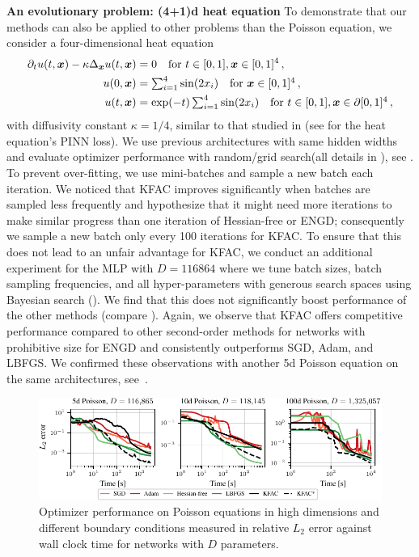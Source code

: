 \textbf{An evolutionary problem: (4+1)d heat equation}
To demonstrate that our methods can also be applied to other problems than the Poisson equation, we consider a four-dimensional heat equation
\begin{align}\label{eq:4D-heat}
  \begin{split}
    \partial_t u(t,{\bm{x}})-\kappa\Delta_{\bm{x}} u(t,{\bm{x}})
    &=
      0 \quad \text{for } t\in[0,1], {\bm{x}}\in [0,1]^{4}\,,
    \\
    u(0,{\bm{x}})
    &=
      \textstyle
      \sum_{i=1}^{4} \sin(2 x_i) \quad \text{for }
      {\bm{x}}\in [0,1]^{4}\,,
    \\
    u(t,{\bm{x}})
    &=
      \textstyle
      \exp(-t) \sum_{i=1}^{4} \sin(2 x_i) \quad \text{for } t\in[0,1], {\bm{x}}\in\partial[0,1]^{4}\,,
  \end{split}
\end{align}
with diffusivity constant $\kappa = 1/4$, similar to that studied in \cite{muller2023achieving} (see  for the heat equation's PINN loss).
We use previous architectures with same hidden widths and evaluate optimizer performance with random/grid search(all details in ), see .
To prevent over-fitting, we use mini-batches and sample a new batch each iteration.
We noticed that KFAC improves significantly when batches are sampled less frequently and hypothesize that it might need more iterations to make similar progress than one iteration of Hessian-free or ENGD; consequently we sample a new batch only every 100 iterations for KFAC.
To ensure that this does not lead to an unfair advantage for KFAC, we conduct an additional experiment for the MLP with $D=\num{116864}$ where we tune batch sizes, batch sampling frequencies, and all hyper-parameters with generous search spaces using Bayesian search ().
We find that this does not significantly boost performance of the other methods (compare ).
Again, we observe that KFAC offers competitive performance compared to other second-order methods for networks with prohibitive size for ENGD and consistently outperforms SGD, Adam, and LBFGS. We confirmed these observations with another 5d Poisson equation on the same architectures, see~.

\begin{figure}
  \centering
  \includegraphics{../kfac_pinns_exp/exp33_poisson_bayes_groupplot/l2_error_over_time.pdf}
  \caption{
    Optimizer performance on Poisson equations in high dimensions and different boundary conditions measured in relative $L_2$ error against wall clock time for networks with $D$ parameters.
  }
  \label{fig:10D-Poisson}
\end{figure}

